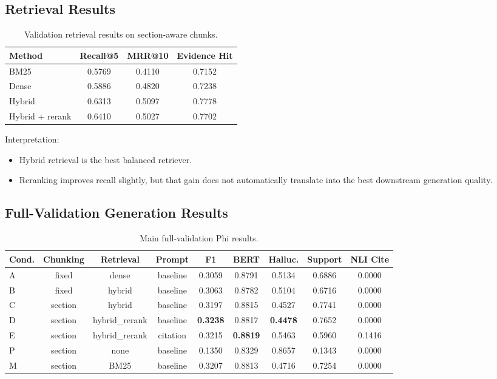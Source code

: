 \documentclass[11pt]{article}
\begin{document}
\subsection{Retrieval Results}
\begin{table}[h]
\centering
\small
\begin{tabular}{lccc}
\toprule
\textbf{Method} & \textbf{Recall@5} & \textbf{MRR@10} & \textbf{Evidence Hit} \\
\midrule
BM25 & 0.5769 & 0.4110 & 0.7152 \\
Dense & 0.5886 & 0.4820 & 0.7238 \\
Hybrid & 0.6313 & 0.5097 & 0.7778 \\
Hybrid + rerank & 0.6410 & 0.5027 & 0.7702 \\
\bottomrule
\end{tabular}
\caption{Validation retrieval results on section-aware chunks.}
\end{table}

Interpretation:
\begin{itemize}
  \item Hybrid retrieval is the best balanced retriever.
  \item Reranking improves recall slightly, but that gain does not automatically translate into the best downstream generation quality.
\end{itemize}

\subsection{Full-Validation Generation Results}
\begin{table}[h]
\centering
\scriptsize
\begin{tabular}{lcccccccc}
\toprule
\textbf{Cond.} & \textbf{Chunking} & \textbf{Retrieval} & \textbf{Prompt} & \textbf{F1} & \textbf{BERT} & \textbf{Halluc.} & \textbf{Support} & \textbf{NLI Cite} \\
\midrule
A & fixed & dense & baseline & 0.3059 & 0.8791 & 0.5134 & 0.6886 & 0.0000 \\
B & fixed & hybrid & baseline & 0.3063 & 0.8782 & 0.5104 & 0.6716 & 0.0000 \\
C & section & hybrid & baseline & 0.3197 & 0.8815 & 0.4527 & 0.7741 & 0.0000 \\
D & section & hybrid\_rerank & baseline & \textbf{0.3238} & 0.8817 & \textbf{0.4478} & 0.7652 & 0.0000 \\
E & section & hybrid\_rerank & citation & 0.3215 & \textbf{0.8819} & 0.5463 & 0.5960 & 0.1416 \\
P & section & none & baseline & 0.1350 & 0.8329 & 0.8657 & 0.1343 & 0.0000 \\
M & section & BM25 & baseline & 0.3207 & 0.8813 & 0.4716 & 0.7254 & 0.0000 \\
\bottomrule
\end{tabular}
\caption{Main full-validation Phi results.}
\end{table}
\end{document}
